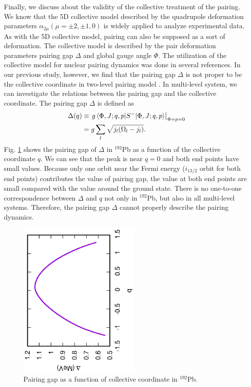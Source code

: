 \documentclass[%
superscriptaddress,
showpacs,
nofootinbib,
amsmath,amssymb,
aps,
prc,
twocolumn,
floatfix ]%
{revtex4-1}
\begin{document}
Finally, we discuss about the validity of the collective treatment of the pairing. We know that the 5D collective model described by the quadrupole deformation parameters $\alpha_{2\mu} (\mu=\pm2,\pm1,0)$ is widely applied to analyze experimental data. As with the 5D collective model, pairing can also be supposed as a sort of deformation. The collective model is described by the pair deformation parameters pairing gap $\Delta$ and global gauge angle $\Phi$. The utilization of the collective model for nuclear pairing dynamics was done in several references\cite{}. In our previous study, however, we find that the pairing gap $\Delta$ is not proper to be the collective coordinate in two-level pairing model \cite{}. In multi-level system, we can investigate the relations between the pairing gap and the collective coordinate. The pairing gap $\Delta$ is defined as
\begin{align}
  \Delta (q) &\equiv \left. g\braket{\Phi,J;q,p|S^-|\Phi,J;q,p} \right|_{\Phi=p=0} \nonumber \\
  &= g\sum_l \sqrt{j_l(\Omega_l-j_l)} .
\end{align}
Fig. \ref{192Pb_gap} shows the pairing gap of $\Delta$ in ${}^{192}$Pb as a function of the collective coordinate $q$. We can see that the peak is near $q=0$ and both end points have small values. Because only one orbit near the Fermi energy ($i_{13/2}$ orbit for both end points) contributes the value of pairing gap, the value at both end points are small compared with the value around the ground state. There is no one-to-one correspondence between $\Delta$ and $q$ not only in ${}^{192}$Pb, but also in all multi-level systems. Therefore, the pairing gap $\Delta$ cannot properly describe the pairing dynamics. 
\begin{figure}[htbp]
 \begin{center}
  \includegraphics[width=60mm,angle=-90]{192Pbgap.eps}
 \end{center}
	\caption{Pairing gap as a function of collective coordinate in ${}^{192}$Pb. 
}
 \label{192Pb_gap}
\end{figure}
\end{document}
